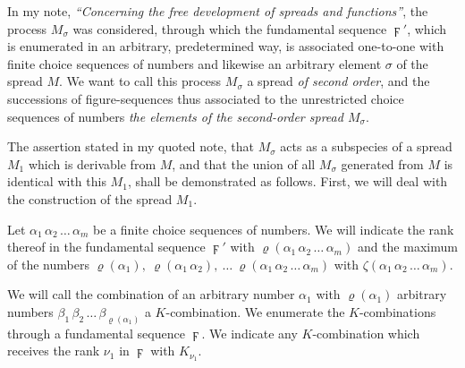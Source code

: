 \documentclass{amsart}
\newcommand\Rank[1]{\varrho\left(#1\right)}
\newcommand\Max[1]{\zeta\left(#1\right)}
\begin{document}


In my note, \emph{``Concerning the free development of spreads and
functions''}, the process $M_\sigma$ was considered, through which
the fundamental sequence $\digamma'$, which is enumerated in an arbitrary,
predetermined way, is associated one-to-one with finite choice sequences of
numbers and likewise an arbitrary element $\sigma$ of the spread $M$. We want to call this process $M_\sigma$ a
spread \emph{of second order}, and the successions of figure-sequences thus
associated to the unrestricted choice sequences of numbers  \emph{the elements of the second-order spread $M_\sigma$}.

The assertion stated in my quoted note, that $M_\sigma$ acts as a subspecies of
a spread $M_1$ which is derivable from $M$, and that the union of all
$M_\sigma$ generated from $M$ is identical with this $M_1$, shall be
demonstrated as follows. First, we will deal with the construction of the
spread $M_1$.

Let $\alpha_1\, \alpha_2\, \dots\, \alpha_m$ be a finite choice sequences of
numbers. We will indicate the rank thereof in the fundamental sequence
$\digamma'$ with $\Rank{\alpha_1\,\alpha_2\,\dots\,\alpha_m}$ and the maximum
of the numbers $\Rank{\alpha_1},\ \Rank{\alpha_1\,\alpha_2},\ \dots\
\Rank{\alpha_1\,\alpha_2\,\dots\,\alpha_m}$ with
$\Max{\alpha_1\,\alpha_2\,\dots\,\alpha_m}$.

We will call the combination of an arbitrary number $\alpha_1$ with
$\Rank{\alpha_1}$ arbitrary numbers
$\beta_1\,\beta_2\,\dots\,\beta_{\Rank{\alpha_1}}$ a $K$-combination. We
enumerate the $K$-combinations through a fundamental sequence $\digamma$. We
indicate any $K$-combination which receives the rank $\nu_1$ in $\digamma$ with
$K_{\nu_1}$.
\end{document}
